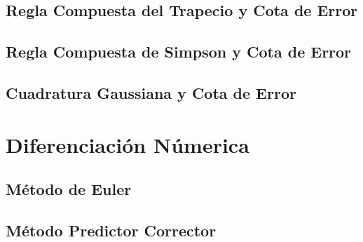 \documentclass[10pt,a4paper]{article}
\begin{document}
	
	
	\subsection{Regla Compuesta del Trapecio y Cota de Error}
	
		
	
	\subsection{Regla Compuesta de Simpson y Cota de Error}
	
	
	\subsection{Cuadratura Gaussiana y Cota de Error}
	
	
	\section{Diferenciación Númerica}
	
	\subsection{Método de Euler}
	
	

	\subsection{Método Predictor Corrector}
	
\end{document}
